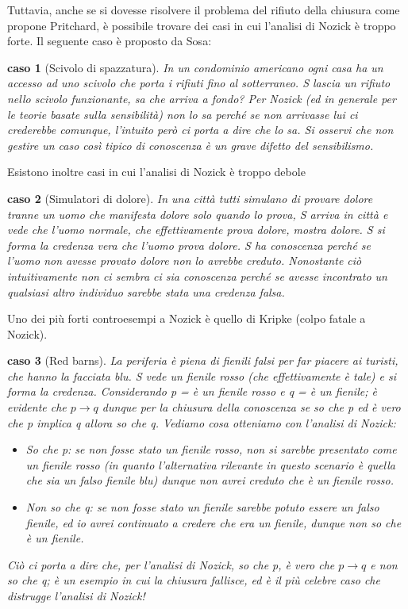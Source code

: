 \documentclass[10pt,a4paper]{article}
\newtheorem{caso}{caso}
\begin{document}
Tuttavia, anche se si dovesse risolvere il problema del rifiuto della chiusura come propone Pritchard, è possibile trovare dei casi in cui l'analisi di Nozick è troppo forte. Il seguente caso è proposto da Sosa:
\begin{caso}[Scivolo di spazzatura]
	In un condominio americano ogni casa ha un accesso ad uno scivolo che porta i rifiuti fino al sotterraneo. S lascia un rifiuto nello scivolo funzionante, sa che arriva a fondo? Per Nozick (ed in generale per le teorie basate sulla sensibilità) non lo sa perché se non arrivasse lui ci crederebbe comunque, l'intuito però ci porta a dire che lo sa. Si osservi che non gestire un caso così tipico di conoscenza è un grave difetto del sensibilismo.
\end{caso}
Esistono inoltre casi in cui l'analisi di Nozick è troppo debole
\begin{caso}[Simulatori di dolore]
	In una città tutti simulano di provare dolore tranne un uomo che manifesta dolore solo quando lo prova, S arriva in città e vede che l'uomo normale, che effettivamente prova dolore, mostra dolore. S si forma la credenza vera che l'uomo prova dolore. S ha conoscenza perché se l'uomo non avesse provato dolore non lo avrebbe creduto. Nonostante ciò intuitivamente non ci sembra ci sia conoscenza perché se avesse incontrato un qualsiasi altro individuo sarebbe stata una credenza falsa. 
\end{caso}
Uno dei più forti controesempi a Nozick è quello di Kripke (colpo fatale a Nozick).
\begin{caso}[Red barns]
	La periferia è piena di fienili falsi per far piacere ai turisti, che hanno la facciata blu. S vede un fienile rosso (che effettivamente è tale) e si forma la credenza. Considerando p = è un fienile rosso e q = è un fienile; è evidente che \(p \rightarrow q\) dunque per la chiusura della conoscenza se so che p ed è vero che p implica q allora so che q. Vediamo cosa otteniamo con l'analisi di Nozick:
	\begin{itemize}
		\item So che p: se non fosse stato un fienile rosso, non si sarebbe presentato come un fienile rosso (in quanto l'alternativa rilevante in questo scenario è quella che sia un falso fienile blu) dunque non avrei creduto che è un fienile rosso. 
		\item Non so che q: se non fosse stato un fienile sarebbe potuto essere un falso fienile, ed io avrei continuato a credere che era un fienile, dunque non so che è un fienile.
	\end{itemize}	
	  Ciò ci porta a dire che, per l'analisi di Nozick, so che p, è vero che \(p \rightarrow q\) e non so che q; è un esempio in cui la chiusura fallisce, ed è il più celebre caso che distrugge l'analisi di Nozick!
\end{caso}
\end{document}
